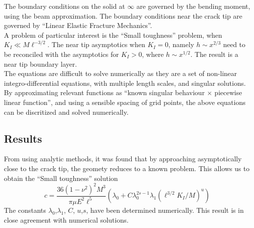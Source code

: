 \documentclass[11pt]{article}
\begin{document}
The boundary conditions on the solid at $\infty$ are governed by the bending 
moment, using the beam approximation. The boundary conditions near the crack
tip are governed by ``Linear Elastic Fracture Mechanics''. 
\\[7pt]
A problem of 
particular interest is the ``Small toughness'' problem, when 
$K_I \ll M \ell^{-3/2}$. The near tip asymptotics when $K_I=0$, namely
$h \sim x^{2/3}$ need to be reconciled with the asymptotics for 
$K_I>0$, where $h \sim x^{1/2}$. The result is a near tip boundary layer.
\\[7pt]
The equations are difficult to solve numerically as they are
a set of non-linear integro-differential equations, with multiple length scales,
and singular solutions. By approximating relevant functions as 
``known singular behaviour $\times$ piecewise linear function'', and using a
sensible spacing of grid points, the above equations can be discritized and
solved numerically.
\vspace{-4pt}
\subsection*{Results}
\vspace{-6pt}
From using analytic methods, it was found that by approaching asymptotically 
close to the crack tip, the geomety reduces to a known problem. 
This allows us to obtain the ``Small toughness'' solution
\[ c = \frac{36(1-\nu^2)^2M^3}{\pi \mu E^2 \ell^5}\left(\lambda_0 + C 
\lambda_0^{2s-1}\lambda_1 (\ell^{3/2}K_I/M)^u \right) \]
\vspace{-2pt}
The constants $\lambda_0$,$\lambda_1$, $C$, $u$,$s$, have been determined 
numerically. This result is in close agreement with numerical solutions.
%
\end{document}

